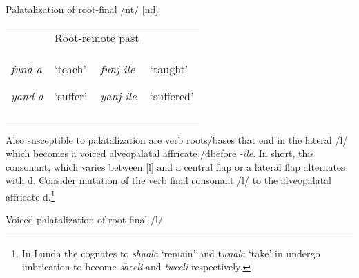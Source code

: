 \documentclass[output=paper]{langsci/langscibook}
\begin{document}
\begin{table}
\caption{Palatalization of root-final /nt/ [nd]}
\label{tab:11}
\end{table}

\begin{tabularx}{\textwidth}{XXXX}
\lsptoprule
\multicolumn{2}{l}{Root-FV} & \multicolumn{2}{l}{Root-remote past}\\
{\emph{fund-a }}

\emph{yand-a} & {‘teach’}

‘suffer’ & {\emph{funj-ile }}

\emph{yanj-ile} & {‘taught’}

‘suffered’\\
\lspbottomrule
\end{tabularx}
Also susceptible to palatalization are verb roots/bases that end in the lateral /l/ which becomes a voiced alveopalatal affricate /dbefore \textit{{}-ile}. In short, this consonant, which varies between [l] and a central flap \textstyleipa{[ɾ]} or a lateral flap \textstyleipa{[ɺ], }alternates with \textstyleipa{/}d. Consider mutation of the verb final consonant /l/ to the alveopalatal affricate \textstyleipa{/}d.\footnote{ In Lunda the cognates to \textit{shaala} ‘remain’ and t\textit{waala }‘take’ in  undergo imbrication to become \textit{sheeli} and \textit{tweeli} respectively.}

\begin{table}
\caption{Voiced palatalization of root-final /l/}
\label{tab:12}
\end{table}
\end{document}
